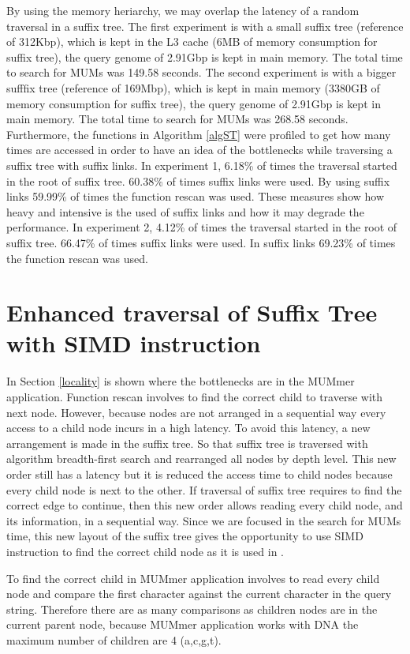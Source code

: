 \documentclass[conference]{IEEEtran}
\begin{document}
By using the memory heriarchy, we may overlap the latency of a random traversal in a suffix tree. The first experiment is with a small suffix tree (reference of 312Kbp), which is kept in the L3 cache (6MB of memory consumption for suffix tree), the query genome of 2.91Gbp is kept in main memory. The total time to search for MUMs was 149.58 seconds. The second experiment is with a bigger sufffix tree (reference of 169Mbp), which is kept in main memory (3380GB of memory consumption for suffix tree), the query genome of 2.91Gbp is kept in main memory. The total time to search for MUMs was 268.58 seconds. Furthermore, the functions in Algorithm \ref{algST} were profiled to get how many times are accessed in order to have an idea of the bottlenecks while traversing a suffix tree with suffix links. In experiment 1, 6.18\% of times the traversal started in the root of suffix tree. 60.38\% of times suffix links were used. By using suffix links 59.99\% of times the function rescan was used. These measures show how heavy and intensive is the used of suffix links and how it may degrade the performance. In experiment 2, 4.12\% of times the traversal started in the root of suffix tree. 66.47\% of times suffix links were used. In suffix links 69.23\% of times the function rescan was used.
 
\section{Enhanced traversal of Suffix Tree with SIMD instruction}
\label{enhanced}
In Section \ref{locality} is shown where the bottlenecks are in the MUMmer application. Function rescan involves to find the correct child to traverse with next node. However, because nodes are not arranged in a sequential way every access to a child node incurs in a high latency. To avoid this latency, a new arrangement is made in the suffix tree. So that suffix tree is traversed with algorithm breadth-first search and rearranged all nodes by depth level. This new order still has a latency but it is reduced the access time to child nodes because every child node is next to the other. If traversal of suffix tree requires to find the correct edge to continue, then this new order allows reading every child node, and its information, in a sequential way. Since we are focused in the search for MUMs time, this new layout of the suffix tree gives the opportunity to use SIMD instruction to find the correct child node as it is used in \cite{Kim2010}. 

To find the correct child in MUMmer application involves to read every child node and compare the first character against the current character in the query string. Therefore there are as many comparisons as children nodes are in the current parent node, because MUMmer application works with DNA the maximum number of children are 4 (a,c,g,t). 
\end{document}
